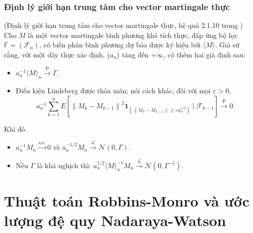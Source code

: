 \subsubsection{Định lý giới hạn trung tâm cho vector martingale thực}
{\dl (Định lý giới hạn trung tâm cho vector martingale thực, hệ quả 2.1.10 trong \cite{duflo}) Cho $M$ là một vector martingale bình phương khả tích thực, đáp ứng bộ lọc $\mathbb{F} = \left(\mathcal{F}_n\right)$, có biến phân bình phương dự báo được ký hiệu bởi $\langle M\rangle$. Giả sử rằng, với một dãy thực xác định, ($a_n$) tăng đến $+\infty$, có thêm hai giả định sau:
\begin{itemize}
    \item $a_n^{-1}\langle M\rangle_n \xrightarrow{\mathrm{P}} \Gamma$.
    \item Điều kiện Lindeberg được thỏa mãn; nói cách khác, đối với mọi $\varepsilon>0$,
$$
a_n^{-1} \sum_{k=1}^n E\left[\left\|M_k-M_{k-1}\right\|^2 \mathbf{1}_{\left(\left\|M_k-M_{k-1}\right\| \geq \varepsilon a_n^{1 / 2}\right)} \mid \mathcal{F}_{k-1}\right] \xrightarrow{\mathrm{P}} 0 .$$
\end{itemize}
Khi đó
\begin{itemize}
    \item $a_n^{-1} M_n \xrightarrow{\text{a.s.}} 0$ và $a_n^{-1 / 2} M_n \xrightarrow{\mathcal{L}} \mathcal{N}(0, \Gamma)$. 
    \item  Nếu $\Gamma$ là khả nghịch thì: $a_n^{1 / 2}\langle M\rangle_n^{-1} M_n \xrightarrow{\mathcal{L}} \mathcal{N}\left(0, \Gamma^{-1}\right)$.
\end{itemize}
}
\section{Thuật toán Robbins-Monro và ước lượng đệ quy Nadaraya-Watson}
